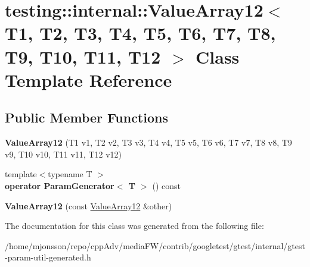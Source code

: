 \hypertarget{classtesting_1_1internal_1_1ValueArray12}{}\section{testing\+:\+:internal\+:\+:Value\+Array12$<$ T1, T2, T3, T4, T5, T6, T7, T8, T9, T10, T11, T12 $>$ Class Template Reference}
\label{classtesting_1_1internal_1_1ValueArray12}
\subsection*{Public Member Functions}
\begin{DoxyCompactItemize}
\item 
\mbox{\label{classtesting_1_1internal_1_1ValueArray12_aaebe12df41b8122fd03f5d6aa1c820a7}} 
{\bfseries Value\+Array12} (T1 v1, T2 v2, T3 v3, T4 v4, T5 v5, T6 v6, T7 v7, T8 v8, T9 v9, T10 v10, T11 v11, T12 v12)
\item 
\mbox{\label{classtesting_1_1internal_1_1ValueArray12_acc840a1c32a10ce160731d66c8105e0b}} 
{\footnotesize template$<$typename T $>$ }\\{\bfseries operator Param\+Generator$<$ T $>$} () const
\item 
\mbox{\label{classtesting_1_1internal_1_1ValueArray12_a901c95791c3b16ca51fcd7fc1323fef2}} 
{\bfseries Value\+Array12} (const \hyperlink{classtesting_1_1internal_1_1ValueArray12}{Value\+Array12} \&other)
\end{DoxyCompactItemize}


The documentation for this class was generated from the following file\+:\begin{DoxyCompactItemize}
\item 
/home/mjonsson/repo/cpp\+Adv/media\+F\+W/contrib/googletest/gtest/internal/gtest-\/param-\/util-\/generated.\+h\end{DoxyCompactItemize}
